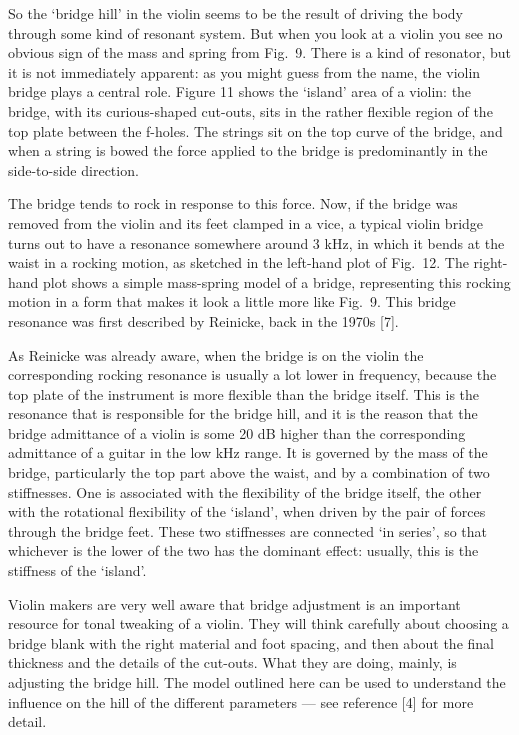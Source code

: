   So the `bridge hill' in the violin seems to be the result of driving the body 
  through some kind of resonant system. But when you look at a violin you see 
  no obvious sign of the mass and spring from Fig.\ 9. There is a kind of 
  resonator, but it is not immediately apparent: as you might guess from the 
  name, the violin bridge plays a central role. Figure 11 shows the `island' 
  area of a violin: the bridge, with its curious-shaped cut-outs, sits in the 
  rather flexible region of the top plate between the f-holes. The strings sit 
  on the top curve of the bridge, and when a string is bowed the force applied 
  to the bridge is predominantly in the side-to-side direction. 

  The bridge tends to rock in response to this force. Now, if the bridge was 
  removed from the violin and its feet clamped in a vice, a typical violin 
  bridge turns out to have a resonance somewhere around 3 kHz, in which it 
  bends at the waist in a rocking motion, as sketched in the left-hand plot of 
  Fig.\ 12. The right-hand plot shows a simple mass-spring model of a bridge, 
  representing this rocking motion in a form that makes it look a little more 
  like Fig.\ 9. This bridge resonance was first described by Reinicke, back in 
  the 1970s [7]. 

  As Reinicke was already aware, when the bridge is on the violin the 
  corresponding rocking resonance is usually a lot lower in frequency, because 
  the top plate of the instrument is more flexible than the bridge itself. This 
  is the resonance that is responsible for the bridge hill, and it is the 
  reason that the bridge admittance of a violin is some 20 dB higher than the 
  corresponding admittance of a guitar in the low kHz range. It is governed by 
  the mass of the bridge, particularly the top part above the waist, and by a 
  combination of two stiffnesses. One is associated with the flexibility of the 
  bridge itself, the other with the rotational flexibility of the `island', 
  when driven by the pair of forces through the bridge feet. These two 
  stiffnesses are connected `in series', so that whichever is the lower of the 
  two has the dominant effect: usually, this is the stiffness of the `island'. 

  Violin makers are very well aware that bridge adjustment is an important 
  resource for tonal tweaking of a violin. They will think carefully about 
  choosing a bridge blank with the right material and foot spacing, and then 
  about the final thickness and the details of the cut-outs. What they are 
  doing, mainly, is adjusting the bridge hill. The model outlined here can be 
  used to understand the influence on the hill of the different parameters --- 
  see reference [4] for more detail. 

